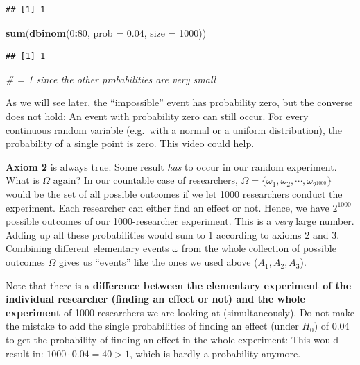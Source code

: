 \documentclass[
]{book}
\newenvironment{Shaded}{\begin{snugshade}}{\end{snugshade}}
\newcommand{\AttributeTok}[1]{\textcolor[rgb]{0.13,0.29,0.53}{#1}}
\newcommand{\CommentTok}[1]{\textcolor[rgb]{0.56,0.35,0.01}{\textit{#1}}}
\newcommand{\DecValTok}[1]{\textcolor[rgb]{0.00,0.00,0.81}{#1}}
\newcommand{\FloatTok}[1]{\textcolor[rgb]{0.00,0.00,0.81}{#1}}
\newcommand{\FunctionTok}[1]{\textcolor[rgb]{0.13,0.29,0.53}{\textbf{#1}}}
\newcommand{\NormalTok}[1]{#1}
\newcommand{\SpecialCharTok}[1]{\textcolor[rgb]{0.81,0.36,0.00}{\textbf{#1}}}
\begin{document}
\begin{verbatim}
## [1] 1
\end{verbatim}

\begin{Shaded}
\begin{Highlighting}[]
\FunctionTok{sum}\NormalTok{(}\FunctionTok{dbinom}\NormalTok{(}\DecValTok{0}\SpecialCharTok{:}\DecValTok{80}\NormalTok{, }\AttributeTok{prob =} \FloatTok{0.04}\NormalTok{, }\AttributeTok{size =} \DecValTok{1000}\NormalTok{))}
\end{Highlighting}
\end{Shaded}

\begin{verbatim}
## [1] 1
\end{verbatim}

\begin{Shaded}
\begin{Highlighting}[]
\CommentTok{\# = 1 since the other probabilities are very small}
\end{Highlighting}
\end{Shaded}

As we will see later, the ``impossible'' event has probability zero, but the converse does not hold: An event with probability zero can still occur.
For every continuous random variable (e.g.~with a \href{https://en.wikipedia.org/wiki/Normal_distribution}{normal}
or a \href{https://en.wikipedia.org/wiki/Continuous_uniform_distribution}{uniform distribution}), the probability of a single point is zero.
This \href{https://www.youtube.com/watch?v=ZA4JkHKZM50&list=PLIhj5_pQwhMQfGZNQZREjDdJRt0t0sn51&index=10&ab_channel=3Blue1Brown}{video} could help.

\textbf{Axiom 2} is always true. Some result \emph{has} to occur in our random experiment.
What is \(\Omega\) again? In our countable case of researchers, \(\Omega = \{ \omega_1, \omega_2, \cdots, \omega_{2^{1000}} \}\) would be the set of all possible outcomes if we let 1000 researchers conduct the experiment.
Each researcher can either find an effect or not. Hence, we have \(2^{1000}\) possible outcomes of our 1000-researcher experiment. This is a \emph{very} large number. Adding up all
these probabilities would sum to 1 according to axioms 2 and 3. Combining different elementary events \(\omega\) from the whole collection of possible outcomes \(\Omega\)
gives us ``events'' like the ones we used above (\(A_1, A_2, A_3\)).

Note that there is a \textbf{difference between the elementary experiment of the individual researcher (finding an effect or not) and the whole experiment} of
1000 researchers we are looking at (simultaneously).
Do not make the mistake to add the single probabilities of finding an effect (under \(H_0\)) of 0.04 to get the probability of finding an effect in the whole experiment:
This would result in: \(1000 \cdot 0.04 = 40 > 1\), which is hardly a probability anymore.
\end{document}
